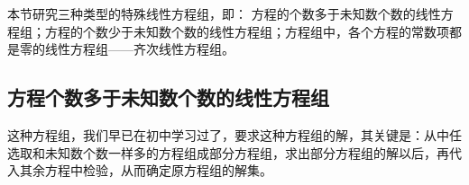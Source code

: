 本节研究三种类型的特殊线性方程组，即：
方程的个数多于未知数个数的线性方程组；方程的个数少于未知数个数的线性方程组；方程组中，各个方程的常数项都是零的线性方程组——齐次线性方程组。

\subsection{方程个数多于未知数个数的线性方程组}

这种方程组，我们早已在初中学习过了，要求这种方程组的解，其关键是：从中任选取和未知数个数一样多的方程组成部分方程组，求出部分方程组的解以后，再代入其余方程中检验，从而确定原方程组的解集。















































































